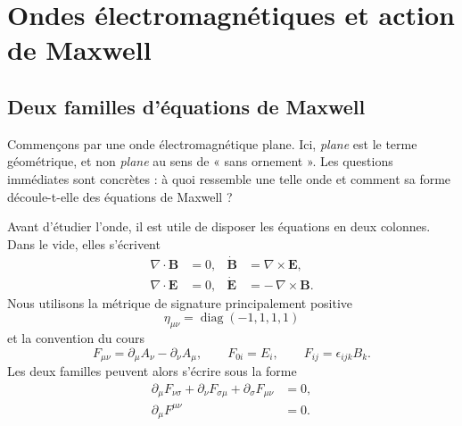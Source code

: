 \chapter{Ondes électromagnétiques et action de Maxwell}


\section{Deux familles d’équations de Maxwell}

Commençons par une onde électromagnétique plane. Ici, \emph{plane} est le terme géométrique, et non \emph{plane} au sens de « sans ornement ». Les questions immédiates sont concrètes : à quoi ressemble une telle onde et comment sa forme découle-t-elle des équations de Maxwell ?

Avant d’étudier l’onde, il est utile de disposer les équations en deux colonnes. Dans le vide, elles s’écrivent
\begin{align}
\nabla\cdot\mathbf B&=0,
&
\dot{\mathbf B}&=\nabla\times\mathbf E,
\label{eq:homogeneous-vector}
\\
\nabla\cdot\mathbf E&=0,
&
\dot{\mathbf E}&=-\,\nabla\times\mathbf B.
\label{eq:dynamical-vector-vacuum}
\end{align}
Nous utilisons la métrique de signature principalement positive
\begin{equation}
\eta_{\mu\nu}=\operatorname{diag}(-1,1,1,1)
\end{equation}
et la convention du cours
\begin{equation}
F_{\mu\nu}
=
\partial_\mu A_\nu-\partial_\nu A_\mu,
\qquad
F_{0i}=E_i,
\qquad
F_{ij}=\epsilon_{ijk}B_k.
\label{eq:course-f-convention}
\end{equation}
Les deux familles peuvent alors s’écrire sous la forme
\begin{align}
\partial_\mu F_{\nu\sigma}
+\partial_\nu F_{\sigma\mu}
+\partial_\sigma F_{\mu\nu}
&=0,
\label{eq:bianchi-l9}
\\
\partial_\mu F^{\mu\nu}
&=0.
\label{eq:vacuum-maxwell-covariant}
\end{align}

